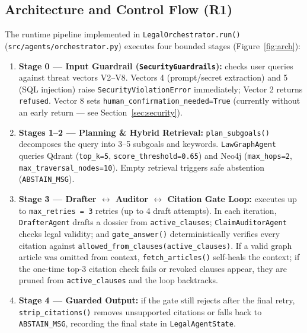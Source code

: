 \documentclass[sigconf,nonacm]{acmart}
\begin{document}
\subsection{Architecture and Control Flow (R1)}
The runtime pipeline implemented in \texttt{LegalOrchestrator.run()} (\texttt{src/agents/orchestrator.py}) executes four bounded stages (Figure~\ref{fig:arch}):
\begin{enumerate}[leftmargin=*]
  \item \textbf{Stage 0 --- Input Guardrail (\texttt{SecurityGuardrails}):} checks user queries against threat vectors V2--V8. Vectors 4 (prompt/secret extraction) and 5 (SQL injection) raise \texttt{SecurityViolationError} immediately; Vector 2 returns \texttt{refused}. Vector 8 sets \texttt{human\_confirmation\_needed=True} (currently without an early return — see Section~\ref{sec:security}).
  \item \textbf{Stages 1--2 --- Planning \& Hybrid Retrieval:} \texttt{plan\_subgoals()} decomposes the query into 3--5 subgoals and keywords. \texttt{LawGraphAgent} queries Qdrant (\texttt{top\_k=5}, \texttt{score\_threshold=0.65}) and Neo4j (\texttt{max\_hops=2}, \texttt{max\_traversal\_nodes=10}). Empty retrieval triggers safe abstention (\texttt{ABSTAIN\_MSG}).
  \item \textbf{Stage 3 --- Drafter $\leftrightarrow$ Auditor $\leftrightarrow$ Citation Gate Loop:} executes up to \texttt{max\_retries = 3} retries (up to 4 draft attempts). In each iteration, \texttt{DrafterAgent} drafts a dossier from \texttt{active\_clauses}; \texttt{ClaimAuditorAgent} checks legal validity; and \texttt{gate\_answer()} deterministically verifies every citation against \texttt{allowed\_from\_clauses(active\_clauses)}. If a valid graph article was omitted from context, \texttt{fetch\_articles()} self-heals the context; if the one-time top-3 citation check fails or revoked clauses appear, they are pruned from \texttt{active\_clauses} and the loop backtracks.
  \item \textbf{Stage 4 --- Guarded Output:} if the gate still rejects after the final retry, \texttt{strip\_citations()} removes unsupported citations or falls back to \texttt{ABSTAIN\_MSG}, recording the final state in \texttt{LegalAgentState}.
\end{enumerate}
\end{document}
